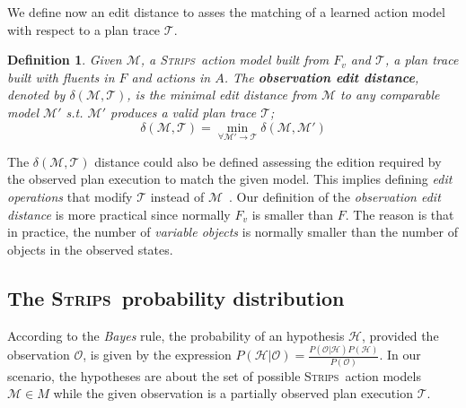 \documentclass[letterpaper]{article} %
\newcommand{\strips}{\textsc{Strips}}     %
\newtheorem{definition}[theorem]{Definition}
\begin{document}
We define now an edit distance to asses the matching of a learned action model with respect to a plan trace $\mathcal{T}$. 

\begin{definition}
  Given $\mathcal{M}$, a \strips\ action model built from $F_v$ and $\mathcal{T}$, a plan trace built with fluents in $F$ and actions in $A$. The {\bf observation edit distance}, denoted by  $\delta(\mathcal{M},\mathcal{T})$, is the minimal edit distance from $\mathcal{M}$ to any {\em comparable} model $\mathcal{M}'$ s.t. $\mathcal{M}'$ produces a valid plan trace $\mathcal{T}$; \[\delta(\mathcal{M},\mathcal{T})=\min_{\forall \mathcal{M}' \rightarrow \mathcal{T}} \delta(\mathcal{M},\mathcal{M}')\]
\end{definition}

The $\delta(\mathcal{M},\mathcal{T})$ distance could also be defined assessing the edition required by the observed plan execution to match the given model. This implies defining {\em edit operations} that modify $\mathcal{T}$ instead of $\mathcal{M}$~\cite{sohrabi:precognition:IJCAI2016}. Our definition of the {\em observation edit distance} is more practical since normally $F_v$ is smaller than $F$. The reason is that in practice, the number of {\em variable objects} is normally smaller than the number of objects in the observed states.


\subsection{The \strips\ probability distribution}
According to the {\em Bayes} rule, the probability of an hypothesis $\mathcal{H}$, provided the observation $\mathcal{O}$, is given by the expression $P(\mathcal{H}|\mathcal{O})=\frac{P(\mathcal{O}|\mathcal{H})P(\mathcal{H})}{P(\mathcal{O})}$. In our scenario, the hypotheses are about the set of possible \strips\ action models $\mathcal{M}\in M$ while the given observation is a partially observed plan execution $\mathcal{T}$.
\end{document}
